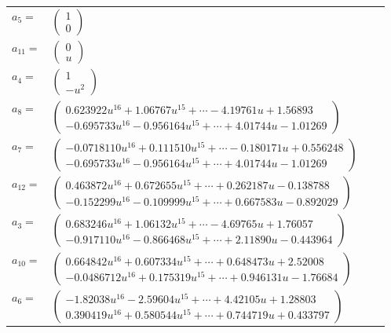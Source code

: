 \documentclass[1p]{elsarticle_modified}
\theoremstyle{definition}
\begin{document}
\begin{tabular}{m{7pt} m{180pt} m{7pt} m{180pt} }
\flushright $a_{5}=$&$\begin{pmatrix}1\\0\end{pmatrix}$ \\
\flushright $a_{11}=$&$\begin{pmatrix}0\\u\end{pmatrix}$ \\
\flushright $a_{4}=$&$\begin{pmatrix}1\\- u^2\end{pmatrix}$ \\
\flushright $a_{8}=$&$\begin{pmatrix}0.623922 u^{16}+1.06767 u^{15}+\cdots-4.19761 u+1.56893\\-0.695733 u^{16}-0.956164 u^{15}+\cdots+4.01744 u-1.01269\end{pmatrix}$ \\
\flushright $a_{7}=$&$\begin{pmatrix}-0.0718110 u^{16}+0.111510 u^{15}+\cdots-0.180171 u+0.556248\\-0.695733 u^{16}-0.956164 u^{15}+\cdots+4.01744 u-1.01269\end{pmatrix}$ \\
\flushright $a_{12}=$&$\begin{pmatrix}0.463872 u^{16}+0.672655 u^{15}+\cdots+0.262187 u-0.138788\\-0.152299 u^{16}-0.109999 u^{15}+\cdots+0.667583 u-0.892029\end{pmatrix}$ \\
\flushright $a_{3}=$&$\begin{pmatrix}0.683246 u^{16}+1.06132 u^{15}+\cdots-4.69765 u+1.76057\\-0.917110 u^{16}-0.866468 u^{15}+\cdots+2.11890 u-0.443964\end{pmatrix}$ \\
\flushright $a_{10}=$&$\begin{pmatrix}0.664842 u^{16}+0.607334 u^{15}+\cdots+0.648473 u+2.52008\\-0.0486712 u^{16}+0.175319 u^{15}+\cdots+0.946131 u-1.76684\end{pmatrix}$ \\
\flushright $a_{6}=$&$\begin{pmatrix}-1.82038 u^{16}-2.59604 u^{15}+\cdots+4.42105 u+1.28803\\0.390419 u^{16}+0.580544 u^{15}+\cdots+0.744719 u+0.433797\end{pmatrix}$ \\

\end{tabular}
\end{document}

